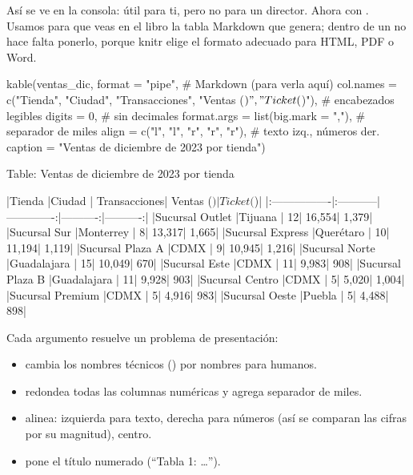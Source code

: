 Así se ve en la consola: útil para ti, pero no para un director. Ahora con
. Usamos  para que veas en el libro
la tabla Markdown que genera; dentro de un  no hace falta
ponerlo, porque knitr elige el formato adecuado para HTML, PDF o Word.

\begin{rcode}
kable(ventas_dic,
      format = "pipe",                        # Markdown (para verla aquí)
      col.names = c("Tienda", "Ciudad", "Transacciones",
                    "Ventas ($)", "Ticket ($)"),  # encabezados legibles
      digits = 0,                             # sin decimales
      format.args = list(big.mark = ","),     # separador de miles
      align = c("l", "l", "r", "r", "r"),     # texto izq., números der.
      caption = "Ventas de diciembre de 2023 por tienda")
\end{rcode}
\begin{rsalida}


Table: Ventas de diciembre de 2023 por tienda

|Tienda           |Ciudad      | Transacciones| Ventas ($)| Ticket ($)|
|:----------------|:-----------|-------------:|----------:|----------:|
|Sucursal Outlet  |Tijuana     |            12|     16,554|      1,379|
|Sucursal Sur     |Monterrey   |             8|     13,317|      1,665|
|Sucursal Express |Querétaro   |            10|     11,194|      1,119|
|Sucursal Plaza A |CDMX        |             9|     10,945|      1,216|
|Sucursal Norte   |Guadalajara |            15|     10,049|        670|
|Sucursal Este    |CDMX        |            11|      9,983|        908|
|Sucursal Plaza B |Guadalajara |            11|      9,928|        903|
|Sucursal Centro  |CDMX        |             5|      5,020|      1,004|
|Sucursal Premium |CDMX        |             5|      4,916|        983|
|Sucursal Oeste   |Puebla      |             5|      4,488|        898|
\end{rsalida}

Cada argumento resuelve un problema de presentación:

\begin{itemize}
  \item {} cambia los nombres técnicos
        () por nombres para humanos.
  \item {} redondea todas las columnas numéricas y
         agrega separador de
        miles.
  \item {} alinea:  izquierda para texto,
         derecha para números (así se comparan las cifras por
        su magnitud),  centro.
  \item {} pone el título numerado (``Tabla 1: \ldots'').
\end{itemize}

